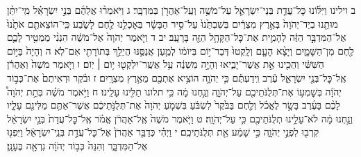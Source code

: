 \documentclass[twoside, openany, parskip=half, 11pt]{book}
\begin{document}
ב וילינו וַיִּלּ֜וֹנוּ כׇּל־עֲדַ֧ת בְּנֵי־יִשְׂרָאֵ֛ל עַל־מֹשֶׁ֥ה וְעַֽל־אַהֲרֹ֖ן בַּמִּדְבָּֽר׃ ג וַיֹּאמְר֨וּ אֲלֵהֶ֜ם בְּנֵ֣י יִשְׂרָאֵ֗ל מִֽי־יִתֵּ֨ן מוּתֵ֤נוּ בְיַד־יְהֹוָה֙ בְּאֶ֣רֶץ מִצְרַ֔יִם בְּשִׁבְתֵּ֙נוּ֙ עַל־סִ֣יר הַבָּשָׂ֔ר בְּאׇכְלֵ֥נוּ לֶ֖חֶם לָשֹׂ֑בַע כִּֽי־הוֹצֵאתֶ֤ם אֹתָ֙נוּ֙ אֶל־הַמִּדְבָּ֣ר הַזֶּ֔ה לְהָמִ֛ית אֶת־כׇּל־הַקָּהָ֥ל הַזֶּ֖ה בָּרָעָֽב׃
יב ד וַיֹּ֤אמֶר יְהֹוָה֙ אֶל־מֹשֶׁ֔ה הִנְנִ֨י מַמְטִ֥יר לָכֶ֛ם לֶ֖חֶם מִן־הַשָּׁמָ֑יִם וְיָצָ֨א הָעָ֤ם וְלָֽקְטוּ֙ דְּבַר־י֣וֹם בְּיוֹמ֔וֹ לְמַ֧עַן אֲנַסֶּ֛נּוּ הֲיֵלֵ֥ךְ בְּתוֹרָתִ֖י אִם־לֹֽא׃ ה וְהָיָה֙ בַּיּ֣וֹם הַשִּׁשִּׁ֔י וְהֵכִ֖ינוּ אֵ֣ת אֲשֶׁר־יָבִ֑יאוּ וְהָיָ֣ה מִשְׁנֶ֔ה עַ֥ל אֲשֶֽׁר־יִלְקְט֖וּ י֥וֹם ׀ יֽוֹם׃ ו וַיֹּ֤אמֶר מֹשֶׁה֙ וְאַהֲרֹ֔ן אֶֽל־כׇּל־בְּנֵ֖י יִשְׂרָאֵ֑ל עֶ֕רֶב וִֽידַעְתֶּ֕ם כִּ֧י יְהֹוָ֛ה הוֹצִ֥יא אֶתְכֶ֖ם מֵאֶ֥רֶץ מִצְרָֽיִם׃ ז וּבֹ֗קֶר וּרְאִיתֶם֙ אֶת־כְּב֣וֹד יְהֹוָ֔ה בְּשׇׁמְע֥וֹ אֶת־תְּלֻנֹּתֵיכֶ֖ם עַל־יְהֹוָ֑ה וְנַ֣חְנוּ מָ֔ה כִּ֥י תלונו תַלִּ֖ינוּ עָלֵֽינוּ׃ ח וַיֹּ֣אמֶר מֹשֶׁ֗ה בְּתֵ֣ת יְהֹוָה֩ לָכֶ֨ם בָּעֶ֜רֶב בָּשָׂ֣ר לֶאֱכֹ֗ל וְלֶ֤חֶם בַּבֹּ֙קֶר֙ לִשְׂבֹּ֔עַ בִּשְׁמֹ֤עַ יְהֹוָה֙ אֶת־תְּלֻנֹּ֣תֵיכֶ֔ם אֲשֶׁר־אַתֶּ֥ם מַלִּינִ֖ם עָלָ֑יו וְנַ֣חְנוּ מָ֔ה לֹא־עָלֵ֥ינוּ תְלֻנֹּתֵיכֶ֖ם כִּ֥י עַל־יְהֹוָֽה׃ ט וַיֹּ֤אמֶר מֹשֶׁה֙ אֶֽל־אַהֲרֹ֔ן אֱמֹ֗ר אֶֽל־כׇּל־עֲדַת֙ בְּנֵ֣י יִשְׂרָאֵ֔ל קִרְב֖וּ לִפְנֵ֣י יְהֹוָ֑ה כִּ֣י שָׁמַ֔ע אֵ֖ת תְּלֻנֹּתֵיכֶֽם׃ י וַיְהִ֗י כְּדַבֵּ֤ר אַהֲרֹן֙ אֶל־כׇּל־עֲדַ֣ת בְּנֵֽי־יִשְׂרָאֵ֔ל וַיִּפְנ֖וּ אֶל־הַמִּדְבָּ֑ר וְהִנֵּה֙ כְּב֣וֹד יְהֹוָ֔ה נִרְאָ֖ה בֶּעָנָֽן׃
\end{document}
